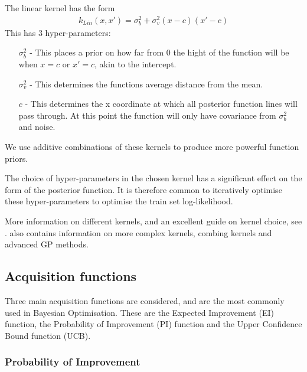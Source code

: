The linear kernel has the form
\begin{align}
	k_{Lin}(x, x') = \sigma_b^2 + \sigma_v^2(x-c)(x'-c)
\end{align}
This has 3 hyper-parameters:
\begin{itemize}
	\item[\( \sigma_b^2 \)] - This places a prior on how far from 0 the hight of the function will be when \( x = c \) or \( x' = c \), akin to the intercept.
	\item[\( \sigma_v^2 \)] - This determines the functions average distance from the mean.
	\item[\( c \)] - This determines the x coordinate at which all posterior function lines will pass through. At this point the function will only have covariance from \( \sigma_b^2 \) and noise.
\end{itemize}

We use additive combinations of these kernels to produce more powerful function priors. 

The choice of hyper-parameters in the chosen kernel has a significant effect on the form of the posterior function. It is therefore common to iteratively optimise these hyper-parameters to optimise the train set log-likelihood.

More information on different kernels, and an excellent guide on kernel choice, see \citet{duvenaud2014automatic}. \citet{williams2006gaussian} also contains information on more complex kernels, combing kernels and advanced GP methods.

\subsection{Acquisition functions}

Three main acquisition functions are considered, and are the most commonly used in Bayesian Optimisation. These are the Expected Improvement (EI) function, the Probability of Improvement (PI) function and the Upper Confidence Bound function (UCB). 

\subsubsection{Probability of Improvement}

